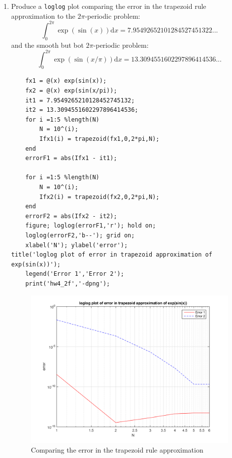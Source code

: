\documentclass[14pt,a4paper]{article}
\begin{document}
\begin{enumerate}
	\label{2f} 
	\item Produce a \texttt{loglog} plot comparing the error in the trapezoid rule approximation to the $2\pi$-periodic problem:
	$$ \int_{0}^{2\pi} \exp(\sin(x))\mathrm{d}x = 7.95492652101284527451322...$$	
		and the smooth but bot $2\pi$-periodic problem:
	$$ \int_{0}^{2\pi} \exp(\sin(x/\pi))\mathrm{d}x = 13.3094551602297896414536...$$
	\begin{lstlisting}
	fx1 = @(x) exp(sin(x));
	fx2 = @(x) exp(sin(x/pi));
	it1 = 7.9549265210128452745132;
	it2 = 13.3094551602297896414536;
	for i =1:5 %length(N)
		N = 10^(i);
		Ifx1(i) = trapezoid(fx1,0,2*pi,N);
	end
	errorF1 = abs(Ifx1 - it1);
	
	for i =1:5 %length(N)
		N = 10^(i);
		Ifx2(i) = trapezoid(fx2,0,2*pi,N);
	end
	errorF2 = abs(Ifx2 - it2);
	figure; loglog(errorF1,'r'); hold on;
	loglog(errorF2,'b--'); grid on;
	xlabel('N'); ylabel('error');
title('loglog plot of error in trapezoid approximation of exp(sin(x))');
	legend('Error 1','Error 2');
	print('hw4_2f','-dpng');
	\end{lstlisting}
	\begin{figure}[htp]
		\centering
		\includegraphics[scale=0.5]{hw4_2f.png}
		\caption{Comparing the error in the trapezoid rule approximation}
	\end{figure} 
		

\end{enumerate}
\end{document}
